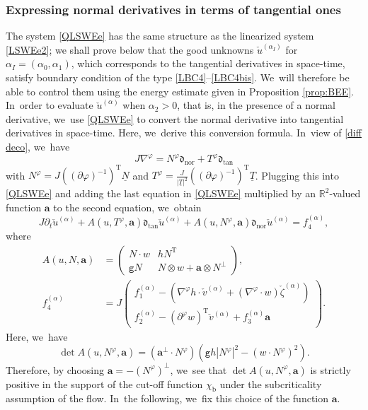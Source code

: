 \documentclass[10pt]{amsart}
\newcommand{\dtan}{{\mathfrak d}_\mathrm{tan}}
\newcommand{\dnor}{{\mathfrak d}_\mathrm{nor}}
\newcommand{\gr}{{\mathtt g}}
\newcommand{\R}{{\mathbb R}}
\newcommand{\dt}{\partial_t}
\newcommand{\ul}[1]{\underline{#1}}
\theoremstyle{definition}
\begin{document}
\subsubsection{Expressing normal derivatives in terms of tangential ones}
The system \eqref{QLSWEe} has the same structure as the linearized system \eqref{LSWEe2};
we shall prove below that the good unknowns $\check{u}^{(\alpha_I)}$ for $\alpha_I=(\alpha_0,\alpha_1)$,
which corresponds to the tangential derivatives in space-time, satisfy boundary condition of the type \eqref{LBC4}--\eqref{LBC4bis}. We~will therefore be able to control them using the energy estimate given in Proposition \ref{prop:BEE}. In~order to evaluate $\check{u}^{(\alpha)}$ when $\alpha_2>0$, that is, in the presence of a normal derivative, we~use \eqref{QLSWEe} to convert the normal derivative into tangential derivatives in space-time.
Here, we~derive this conversion formula. In~view of \eqref{diff deco}, we~have
\begin{equation}\label{diff deco2}
J\nabla^\varphi=N^\varphi\dnor+T^\varphi\dtan
\end{equation}
with $N^\varphi=J((\partial\varphi)^{-1})^\mathrm{T}\ul{N}$ and $T^\varphi=\frac{J}{|\ul{T}|^2}((\partial\varphi)^{-1})^\mathrm{T}\ul{T}$.
Plugging this into \eqref{QLSWEe} and adding the last equation in \eqref{QLSWEe} multiplied by an $\R^2$-valued function $\bm{a}$ to the second equation, we~obtain
\begin{equation}\label{QLSWEe2}
J\dt\check{u}^{(\alpha)}+A(u,T^\varphi,\bm{a})\dtan\check{u}^{(\alpha)}+A(u,N^\varphi,\bm{a})\dnor\check{u}^{(\alpha)}=f_4^{(\alpha)},
\end{equation}
where
\begin{align*}
A(u,N,\bm{a}) &=
\begin{pmatrix}
N\cdot w & hN^\mathrm{T} \\
\gr N & N\otimes w+\bm{a}\otimes N^\perp
\end{pmatrix}, \\
f_4^{(\alpha)} &= J
\begin{pmatrix}
f_1^{(\alpha)} - (\nabla^\varphi h\cdot\check{v}^{(\alpha)} + (\nabla^\varphi\cdot w)\check{\zeta}^{(\alpha)}) \\
f_2^{(\alpha)} - (\partial^\varphi w)^\mathrm{T}\check{v}^{(\alpha)} + f_3^{(\alpha)}\bm{a}
\end{pmatrix}.
\end{align*}
Here, we~have
\[
\det A(u,N^\varphi,\bm{a}) = (\bm{a}^\perp\cdot N^\varphi)(\gr h|N^\varphi|^2-(w\cdot N^\varphi)^2).
\]
Therefore, by choosing $\bm{a}=-(N^\varphi)^\perp$, we~see that $\det A(u,N^\varphi,\bm{a})$ is strictly positive
in the support of the cut-off function $\chi_\mathrm{b}$ under the subcriticality assumption of the flow. In~the following, we~fix this choice of the function $\bm{a}$.
\end{document}

